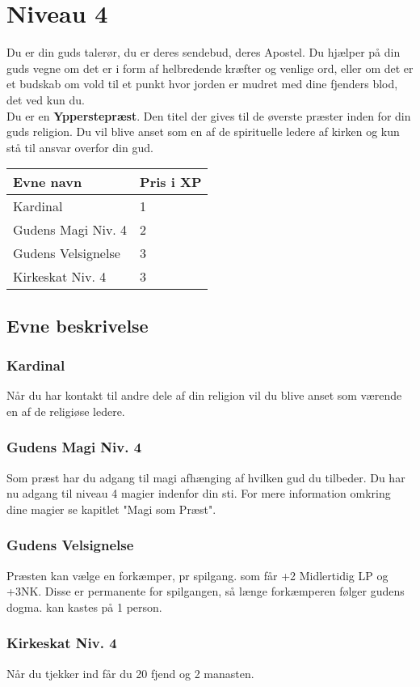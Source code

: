 \chapter{Niveau 4}
Du er din guds talerør, du er deres sendebud, deres Apostel. Du hjælper på din guds vegne om det er i form af helbredende kræfter og venlige ord, eller om det er et budskab om vold til et punkt hvor jorden er mudret med dine fjenders blod, det ved kun du.\\
Du er en \textbf{Ypperstepræst}. Den titel der gives til de øverste præster inden for din guds religion. Du vil blive anset som en af de spirituelle ledere af kirken og kun stå til ansvar overfor din gud.\\

\begin{table}[H]
    \centering
    \begin{tabular}{|p{}|p{}|}
    \rowcolor{cerulean!80}\hline
        Evne navn & Pris i XP \\\hline
            Kardinal & 1\\\hline
            Gudens Magi Niv. 4 & 2\\\hline
            Gudens Velsignelse & 3\\\hline
            Kirkeskat Niv. 4 & 3\\\hline
    \end{tabular}
\end{table}

\section{Evne beskrivelse}

\subsection{Kardinal}
Når du har kontakt til andre dele af din religion vil du blive anset som værende en af de religiøse ledere.

\subsection{Gudens Magi Niv. 4}
Som præst har du adgang til magi afhænging af hvilken gud du tilbeder. Du har nu adgang til niveau 4 magier indenfor din sti. For mere information omkring dine magier se kapitlet "Magi som Præst".

\subsection{Gudens Velsignelse}
Præsten kan vælge en forkæmper, pr spilgang. som får +2 Midlertidig LP og +3NK. Disse er permanente for spilgangen, så længe forkæmperen følger gudens dogma. kan kastes på 1 person.

\subsection{Kirkeskat Niv. 4}
Når du tjekker ind får du 20 fjend og 2 manasten.